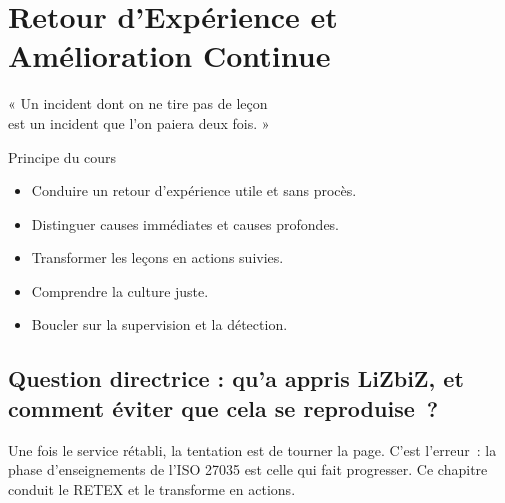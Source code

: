 
\chapter{Retour d'Expérience et Amélioration Continue}
\label{chap:retex}

\epigraph{%
    « Un incident dont on ne tire pas de leçon\\
    est un incident que l'on paiera deux fois. »%
}{Principe du cours}


\begin{boxobjectifs}
\begin{itemize}
    \item Conduire un retour d'expérience utile et sans procès.
    \item Distinguer causes immédiates et causes profondes.
    \item Transformer les leçons en actions suivies.
    \item Comprendre la culture juste.
    \item Boucler sur la supervision et la détection.
\end{itemize}
\end{boxobjectifs}

\bigskip

\section*{Question directrice : qu'a appris LiZbiZ, et comment éviter que cela se reproduise~?}

Une fois le service rétabli, la tentation est de tourner la page. C'est
l'erreur~: la phase d'enseignements de l'ISO 27035 est celle qui fait
progresser. Ce chapitre conduit le RETEX et le transforme en actions.

